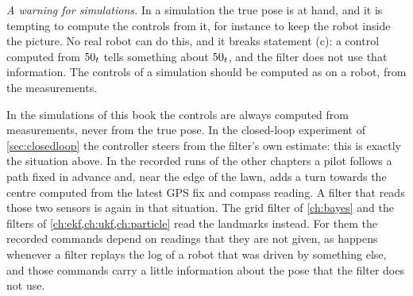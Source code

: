 \emph{A warning for simulations.} In a simulation the true pose is at
hand, and it is tempting to compute the controls from it, for instance to
keep the robot inside the picture. No real robot can do this, and it
breaks statement (c): a control computed from $50_t$ tells something about
$50_t$, and the filter does not use that information. The controls of a
simulation should be computed as on a robot, from the measurements.

\begin{mower}
In the simulations of this book the controls are always computed from
measurements, never from the true pose. In the closed-loop experiment of
\cref{sec:closedloop} the controller steers from the filter's own
estimate: this is exactly the situation above. In the recorded runs of the
other chapters a pilot follows a path fixed in advance and, near the edge
of the lawn, adds a turn towards the centre computed from the latest GPS
fix and compass reading. A filter that reads those two sensors is again in
that situation. The grid filter of \cref{ch:bayes} and the filters of
\cref{ch:ekf,ch:ukf,ch:particle} read the landmarks instead. For them the recorded commands depend on readings that
they are not given, as happens whenever a filter replays the log of a
robot that was driven by something else, and those commands carry a little
information about the pose that the filter does not use.
\end{mower}

